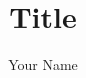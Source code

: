 \documentclass{article}
\title{Title}
\author{Your Name}
\begin{document}
\maketitle{}









\end{document}
